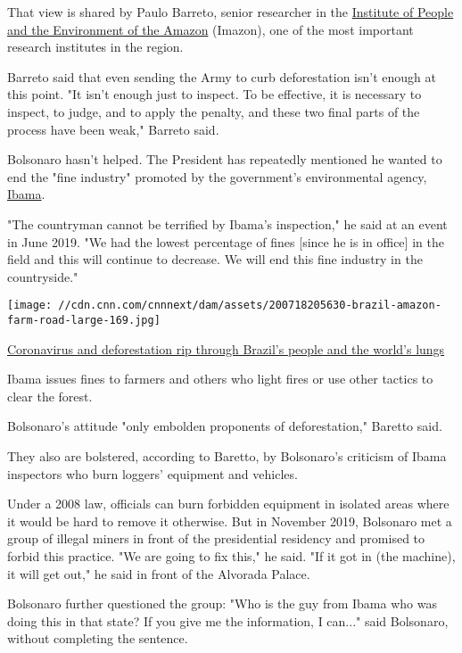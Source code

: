 That view is shared by Paulo Barreto, senior researcher in the
\href{https://imazon.org.br/en/about-us/who-we-are/}{Institute of People
and the Environment of the Amazon} (Imazon), one of the most important
research institutes in the region.

Barreto said that even sending the Army to curb deforestation isn't
enough at this point. "It isn't enough just to inspect. To be effective,
it is necessary to inspect, to judge, and to apply the penalty, and
these two final parts of the process have been weak," Barreto said.

Bolsonaro hasn't helped. The President has repeatedly mentioned he
wanted to end the "fine industry" promoted by the government's
environmental agency, \href{https://www.gov.br/ibama/pt-br}{Ibama}.

"The countryman cannot be terrified by Ibama's inspection," he said at
an event in June 2019. "We had the lowest percentage of fines {[}since
he is in office{]} in the field and this will continue to decrease. We
will end this fine industry in the countryside."

\href{/2020/07/19/americas/brazil-coronavirus-amazon-deforestation-bolsonaro-weir/index.html}{}

\texttt{[image: //cdn.cnn.com/cnnnext/dam/assets/200718205630-brazil-amazon-farm-road-large-169.jpg]}

\href{/2020/07/19/americas/brazil-coronavirus-amazon-deforestation-bolsonaro-weir/index.html}{Coronavirus
and deforestation rip through Brazil's people and the world's lungs}

Ibama issues fines to farmers and others who light fires or use other
tactics to clear the forest.

Bolsonaro's attitude "only embolden proponents of deforestation,"
Baretto said.

They also are bolstered, according to Baretto, by Bolsonaro's criticism
of Ibama inspectors who burn loggers' equipment and vehicles.

Under a 2008 law, officials can burn forbidden equipment in isolated
areas where it would be hard to remove it otherwise. But in November
2019, Bolsonaro met a group of illegal miners in front of the
presidential residency and promised to forbid this practice. "We are
going to fix this," he said. "If it got in (the machine), it will get
out," he said in front of the Alvorada Palace.

Bolsonaro further questioned the group: "Who is the guy from Ibama who
was doing this in that state? If you give me the information, I can..."
said Bolsonaro, without completing the sentence.

